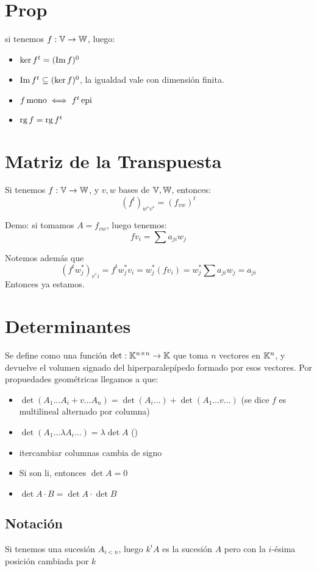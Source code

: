 \documentclass{article}
\begin{document}
\section*{Prop}
si tenemos $f : \mathbb{V} \to \mathbb{W}$, luego:
\begin{itemize}
	\item $\ker f^t = (\operatorname{Im} f)^0$
	\item $\operatorname{Im} f^t \subseteq (\ker f)^0$, la igualdad vale con dimensión finita.
	\item $f \operatorname{mono} \iff f^t \operatorname{epi}$
	\item $\operatorname{rg} f = \operatorname{rg} f^t$
\end{itemize}

\section*{Matriz de la Transpuesta}
Si tenemos $f : \mathbb{V} \to \mathbb{W}$, y $v, w$ bases de $\mathbb{V}, \mathbb{W}$, entonces:
\[
	(f^t)_{w^*v^*} = (f_{vw})^t
\]

Demo: si tomamos $A = f_{vw}$, luego tenemos:
\[
	fv_i = \sum a_{ji}w_j
\]

Notemos además que
\[
	(f^tw^*_j)_{v^*i} = f^tw^*_jv_i = w^*_j(fv_i) = w^*_j \sum a_{ji}w_j = a_{ji}
\]
Entonces ya estamos.

\section*{Determinantes}
Se define como una función $\det : \mathbb{K}^{n \times n} \to \mathbb{K}$ que toma $n$ vectores en $\mathbb{K}^n$, y devuelve el volumen signado del hiperparalepípedo formado por esos vectores. Por propuedades geométricas llegamos a que:
\begin{itemize}
	\item $\det (A_1 \dots A_i + v \dots A_n) = \det (A_i\dots) + \det (A_1 \dots v \dots)$ (se dice $f$ es multilineal alternado por columna)
	\item $\det (A_1 \dots \lambda A_i\dots) = \lambda \det A$ ()
	\item itercambiar columnas cambia de signo
	\item Si son li, entonces $\det A = 0$
	\item $\det A \cdot B = \det A \cdot \det B$
\end{itemize}

\subsection*{Notación}
Si tenemos una sucesión $A_{i < n}$, luego $k^iA$ es la sucesión $A$ pero con la $i$-ésima posición cambiada por $k$
\end{document}
